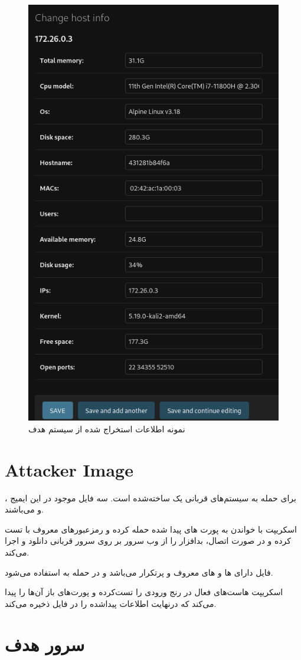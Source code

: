 \begin{figure}[h!]
    \centering
    \includegraphics[width=0.5\linewidth]{images/sample_host.png}
    \caption{نمونه اطلاعات استخراج شده از سیستم هدف}
    \label{fig:sample_host}
\end{figure}


\section{Attacker Image}

برای حمله به سیستم‌های قربانی یک  ساخته‌شده است. سه فایل موجود در این ایمیج ،  و  می‌باشند. 

اسکریپت  با خواندن  به پورت های  پیدا شده حمله کرده و رمزعبور‌های معروف با   تست کرده و در صورت اتصال، بدافزار را از وب سرور بر روی سرور قربانی دانلود و اجرا می‌کند. 

فایل  دارای ها و های معروف و پرتکرار می‌باشد و در حمله به  استفاده می‌شود. 

اسکریپت  هاست‌های فعال در رنج ورودی را تست‌کرده و پورت‌های باز آن‌ها را پیدا می‌کند که درنهایت اطلاعات پیداشده را در فایل  ذخیره می‌کند. 

\section{سرور هدف}

